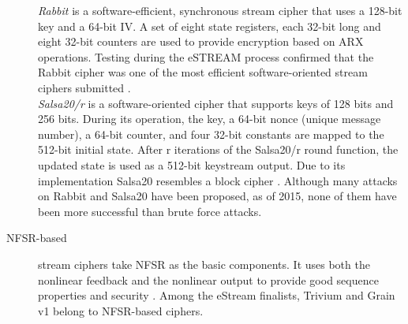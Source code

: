 \begin{description}
	\emph{Rabbit} is a software-efficient, synchronous stream cipher that uses a 128-bit key and a 64-bit IV. A set of eight state registers, each 32-bit long and eight 32-bit counters are used to provide encryption based on ARX operations. Testing during the eSTREAM process confirmed that the Rabbit cipher was one of the most efficient software-oriented stream ciphers submitted \cite{boesgaard2008rabbit}.\\
	\emph{Salsa20/r} is a software-oriented cipher that supports keys of 128 bits and 256 bits. During its operation, the key, a 64-bit nonce (unique message number), a 64-bit counter, and four 32-bit constants are mapped to the 512-bit initial state. After r iterations of the Salsa20/r round function, the updated state is used as a 512-bit keystream output. Due to its implementation Salsa20 resembles a block cipher \cite{bernstein2008salsa20}.
	Although many attacks on Rabbit and Salsa20 have been proposed, as of 2015, none of them have been more successful than brute force attacks. 
	\item [NFSR-based] stream ciphers take NFSR as the basic components. It uses both the nonlinear feedback and the nonlinear output to provide good sequence properties and security \cite{jiao2020stream}. 
	Among the eStream finalists, Trivium and Grain v1 belong to NFSR-based ciphers.
	
	\begin{figure}[h]
		

\end{figure}
\end{description}
